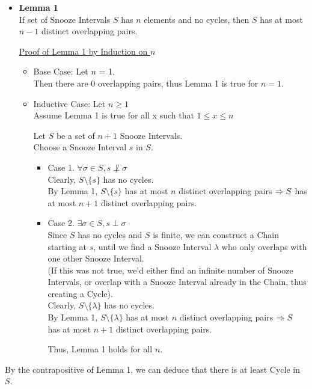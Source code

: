 \documentclass[fleqn]{article}
\newcommand{\set}[1]{\lbrace #1 \rbrace}
\newcommand{\ioverlap}{\perp}
\begin{document}
\begin{itemize}
  \item \textbf{Lemma 1}\\
        If set of Snooze Intervals $S$ has $n$ elements and no cycles,
        then $S$ has at most $n-1$ distinct overlapping pairs.

        \underline{Proof of Lemma 1 by Induction on $n$}
        \begin{itemize}
          \item Base Case: Let $n$ = 1.\\
                Then there are 0 overlapping pairs, thus
                Lemma 1 is true for $n=1$.
          \item Inductive Case: Let $n \geq 1$\\
                Assume Lemma 1 is true for all x such that $1 \leq x \leq n$

                Let $S$ be a set of $n+1$ Snooze Intervals.\\
                Choose a Snooze Interval $s$ in $S$.

                \begin{itemize}
                  \item Case 1. $\forall \sigma \in S, s \not\ioverlap \sigma$\\
                        Clearly, $S \setminus \set{s}$ has no cycles.\\
                        By Lemma 1, $S \setminus \set{s}$ has at most 
                        $n$ distinct overlapping pairs $\Rightarrow\\
                        S$ has at most $n+1$ distinct overlapping pairs.
                  \item Case 2. $\exists \sigma \in S, s \ioverlap \sigma$\\
                        Since $S$ has no cycles and $S$ is finite, we
                        can construct a Chain starting at $s$, until
                        we find a Snooze Interval $\lambda$ who only
                        overlaps with one other Snooze Interval.\\
                        (If this was not true, we'd either find an
                         infinite number of Snooze Intervals, or 
                         overlap with a Snooze Interval already in 
                         the Chain, thus creating a Cycle).\\
                        Clearly, $S \setminus \set{\lambda}$ has no cycles.\\
                        By Lemma 1, $S \setminus \set{\lambda}$ has at
                        most $n$ distinct overlapping pairs $\Rightarrow\\
                        S$ has at most $n+1$ distinct overlapping pairs.
                        
                        Thus, Lemma 1 holds for all $n$.
                \end{itemize}
        \end{itemize}

\end{itemize}
By the contrapositive of Lemma 1, we can deduce that there is at least Cycle in $S$. 
\end{document}
